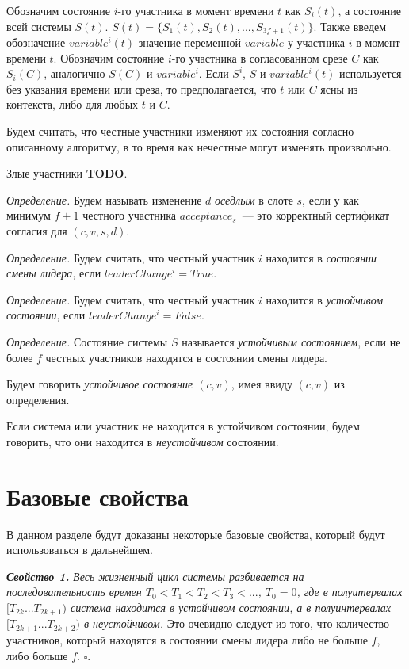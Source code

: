 Обозначим состояние $i$-го участника в момент времени $t$ как $S_i(t)$, а состояние всей системы $S(t)$. 
$S(t)=\{S_1(t), S_2(t),..., S_{3f+1}(t)\}$. Также введем обозначение $variable^i(t)$ значение переменной $variable$ у участника $i$ в момент времени $t$.
Обозначим состояние $i$-го участника в согласованном срезе $C$ как $S_i(C)$, аналогично $S(C)$ и $variable^i$.
Если $S^i$, $S$ и $variable^i(t)$ используется без указания времени или среза, то предполагается, что $t$ или $C$ ясны из контекста, либо для любых $t$ и $C$.

Будем считать, что честные участники изменяют их состояния согласно описанному алгоритму, в то время как нечестные могут изменять произвольно.

Злые участники \textbf{TODO}.

\textit{Определение.} Будем называть изменение $d$ \textit{оседлым} в слоте $s$, если у как минимум $f+1$ честного участника $acceptance_s$~--- это корректный сертификат согласия для $(c, v, s, d)$.

\textit{Определение.} Будем считать, что честный участник $i$ находится в \textit{состоянии смены лидера}, если $leaderChange^i = True$.

\textit{Определение.} Будем считать, что честный участник $i$ находится в \textit{устойчивом состоянии}, если $leaderChange^i = False$.

\textit{Определение.} Состояние системы $S$ называется \textit{устойчивым состоянием}, если не более $f$ честных участников находятся в состоянии смены лидера. 

Будем говорить \textit{устойчивое состояние $(c, v)$}, имея ввиду $(c, v)$ из определения.

Если система или участник не находится в устойчивом состоянии, будем говорить, что они находится в \textit{неустойчивом} состоянии.

\section{Базовые свойства}
В данном разделе будут доказаны некоторые базовые свойства, который будут использоваться в дальнейшем.

\textbf{\textit{Свойство 1.}} \textit{Весь жизненный цикл системы разбивается на последовательность времен
$T_0 < T_1 < T_2 < T_3 < ...$, $T_0=0$, где в полуитервалах $[T_{2k}...T_{2k+1})$ система находится в устойчивом состоянии, а в полуинтервалах $[T_{2k+1}...T_{2k+2})$ в неустойчивом.}
Это очевидно следует из того, что количество участников, который находятся в состоянии смены лидера либо не больше $f$, либо больше $f$. $\square$.
\vspace{10pt}

